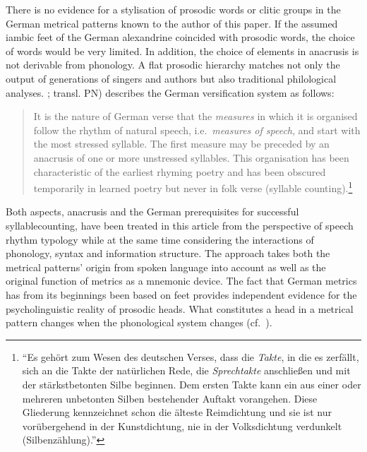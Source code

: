 \documentclass[output=paper
  ,nobabel
  ,uniformtopskip %
]{langscibook}
\begin{document}
There is no evidence for a stylisation of prosodic words or clitic groups in the German metrical patterns known to the author of this paper. If the assumed iambic feet of the German alexandrine coincided with prosodic words, the choice of words would be very limited. In addition, the choice of elements in anacrusis is not derivable from phonology. A flat prosodic hierarchy matches not only the output of generations of singers and authors but also traditional philological analyses. \citet[§16]{Paul1905}; transl. PN) describes the German versification system as follows:
\begin{quote}
It is the nature of German verse that the \emph{measures} in which it is organised follow the rhythm of natural speech, i.e.\ \emph{measures of speech}, and start with the most stressed syllable. The first measure may be preceded by an anacrusis of one or more unstressed syllables. This organisation has been characteristic of the earliest rhyming poetry and has been obscured temporarily in learned poetry but never in folk verse (syllable counting).\footnote{``Es gehört zum Wesen des deutschen Verses, dass die \emph{Takte}, in die es zerfällt, sich an die Takte der natürlichen Rede, die \emph{Sprechtakte} anschließen und mit der stärkstbetonten Silbe beginnen. Dem ersten Takte kann ein aus einer oder mehreren unbetonten Silben bestehender Auftakt vorangehen. Diese Gliederung kennzeichnet schon die älteste Reimdichtung und sie ist nur vorübergehend in der Kunstdichtung, nie in der Volksdichtung verdunkelt (Silbenzählung).''}
\end{quote}

\noindent
Both aspects, anacrusis and the German prerequisites for successful syllable\linebreak counting, have been treated in this article from the perspective of speech rhythm typology while at the same time considering the interactions of phonology, syntax and information structure. The approach takes both the metrical patterns' origin from spoken language into account as well as the original function of metrics as a mnemonic device. The fact that German metrics has from its beginnings been based on feet provides independent evidence for the psycholinguistic reality of prosodic heads. What constitutes a head in a metrical pattern changes when the phonological system changes (cf.\ \eg \citealp{Vennemann1995,NoelAzizHanna2008a}).
\end{document}
